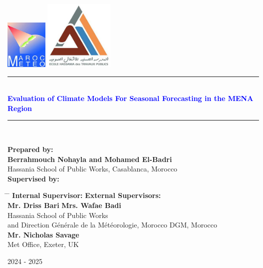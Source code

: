 \clearpage
\begin{titlepage}
  \begin{center}
    \includegraphics[width=0.15\textwidth]{DGM.jpg} \hfill
    \includegraphics[width=0.25\textwidth]{ehtp.jpg} \\[2cm]

    
    \noindent\rule{\textwidth}{1mm}\\[0.5cm]
    {\LARGE \textbf{\textcolor{blue}{Evaluation of Climate Models For Seasonal Forecasting in the MENA Region\\ \vspace{0.1cm} 
   }}}
    \noindent\rule{\textwidth}{1mm}\\[3cm]
    \vfill
 \begin{center}
    \textbf{\large Prepared by:} \\[0.2cm]
    \textbf{Berrahmouch Nohayla and Mohamed El-Badri} \\[0.2cm]
    Hassania School of Public Works, Casablanca, Morocco \\[1.5cm]
    
    \textbf{\large Supervised by:}
\end{center}

\begin{tabbing}
    \hspace{6cm} \= \hspace{6cm} \= \kill 
    \textbf{Internal Supervisor:} \> \> \textbf{External Supervisors:} \\[0.5cm]
    \textbf{Mr. Driss Bari} \> \> \textbf{Mrs. Wafae Badi} \\[0.2cm]
    Hassania School of Public Works \\ 
    and Direction Générale de la Météorologie, Morocco \> \> DGM, Morocco \\[0.5cm]
    
    \> \> \textbf{Mr. Nicholas Savage} \\[0.2cm]
    \> \> Met Office, Exeter, UK \\
\end{tabbing}


    \vfill

    {\large 2024 - 2025} \\[1cm]
  \end{center}
\end{titlepage}
\tableofcontents
